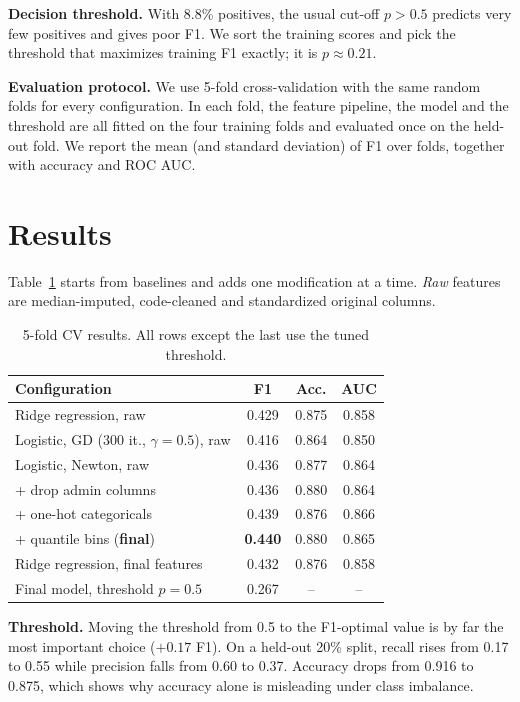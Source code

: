\documentclass[10pt,conference,compsocconf]{IEEEtran}
\begin{document}
\textbf{Decision threshold.} With 8.8\% positives, the usual cut-off
$p>0.5$ predicts very few positives and gives poor F1. We sort the training
scores and pick the threshold that maximizes training F1 exactly; it is
$p\approx0.21$.

\textbf{Evaluation protocol.} We use 5-fold cross-validation with the same
random folds for every configuration. In each fold, the feature pipeline, the
model and the threshold are all fitted on the four training folds and
evaluated once on the held-out fold. We report the mean (and standard
deviation) of F1 over folds, together with accuracy and ROC AUC.

\section{Results}
Table~\ref{tab:ablation} starts from baselines and adds one modification at a
time. \emph{Raw} features are median-imputed, code-cleaned and standardized
original columns.

\begin{table}[htbp]
  \centering
  \caption{5-fold CV results. All rows except the last use the tuned threshold.}
  \label{tab:ablation}
  \begin{tabular}{@{}lccc@{}}
    \toprule
    Configuration & F1 & Acc. & AUC \\
    \midrule
    Ridge regression, raw & 0.429 & 0.875 & 0.858 \\
    Logistic, GD (300 it., $\gamma{=}0.5$), raw & 0.416 & 0.864 & 0.850 \\
    Logistic, Newton, raw & 0.436 & 0.877 & 0.864 \\
    \quad + drop admin columns & 0.436 & 0.880 & 0.864 \\
    \quad + one-hot categoricals & 0.439 & 0.876 & 0.866 \\
    \quad + quantile bins (\textbf{final}) & \textbf{0.440} & 0.880 & 0.865 \\
    Ridge regression, final features & 0.432 & 0.876 & 0.858 \\
    \midrule
    Final model, threshold $p=0.5$ & 0.267 & -- & -- \\
    \bottomrule
  \end{tabular}
\end{table}

\textbf{Threshold.} Moving the threshold from 0.5 to the F1-optimal value is
by far the most important choice ($+0.17$ F1). On a held-out 20\% split,
recall rises from 0.17 to 0.55 while precision falls from 0.60 to 0.37.
Accuracy drops from 0.916 to 0.875, which shows why accuracy alone is
misleading under class imbalance.
\end{document}
